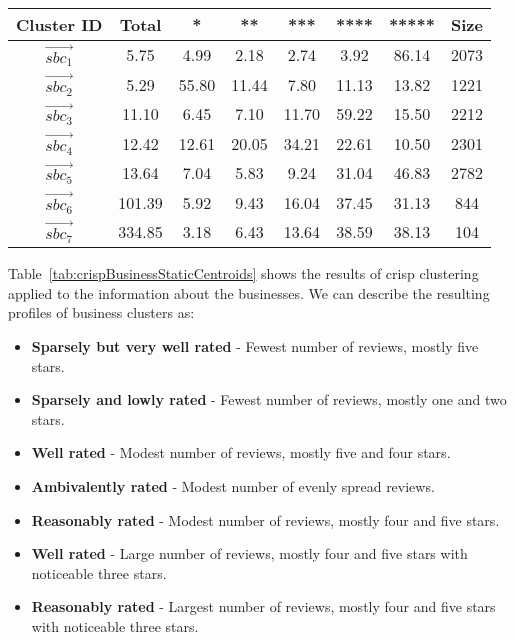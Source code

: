 \documentclass[oribibl]{llncs}
\begin{document}
\begin{table*}[h]
	\caption{Centroids from crisp  clustering of business data }
\centering
\small
{\setlength{\tabcolsep}{0.1cm}
\begin{tabular}{|c|c|c|c|c|c|c|c|}
\hline
 Cluster ID&Total  & *&**&***&****&*****&Size\\
  \hline
$\vec{sbc_1}$&5.75&4.99&2.18&2.74&3.92&86.14&2073\\
\hline
$\vec{sbc_2}$&5.29&55.80&11.44&7.80&11.13&13.82&1221\\
\hline
$\vec{sbc_3}$&11.10&6.45&7.10&11.70&59.22&15.50&2212\\
\hline
$\vec{sbc_4}$&12.42&12.61&20.05&34.21&22.61&10.50&2301\\
\hline
$\vec{sbc_5}$&13.64&7.04&5.83&9.24&31.04&46.83&2782\\
\hline
$\vec{sbc_6}$&101.39&5.92&9.43&16.04&37.45&31.13&844\\
\hline
$\vec{sbc_7}$&334.85&3.18&6.43&13.64&38.59&38.13&104\\
\hline
\end{tabular}}
\label{tab:crispBusinessStaticCentroids} 
\end{table*}

Table~\ref{tab:crispBusinessStaticCentroids} shows the results of crisp clustering applied to the information about the businesses.
We can describe the resulting profiles of business clusters as:
\begin{itemize}
\item [$\vec{sbc}_1$] {\bf Sparsely but very well rated} - Fewest number of reviews, mostly five stars.
\item [$\vec{sbc}_2$] {\bf Sparsely and lowly rated} - Fewest number of reviews, mostly one and two stars.
\item [$\vec{sbc}_3$] {\bf Well rated} - Modest number of reviews, mostly five and four stars.
\item [$\vec{sbc}_4$] {\bf Ambivalently rated} - Modest number of evenly spread reviews.
\item [$\vec{sbc}_5$] {\bf Reasonably rated} - Modest number of reviews, mostly four and five stars.
\item [$\vec{sbc}_6$] {\bf Well rated} - Large number of reviews, mostly  four and five stars with noticeable three stars.
\item [$\vec{sbc}_7$] {\bf Reasonably rated} - Largest number of reviews, mostly  four and five stars with noticeable three stars.
\end{itemize}
\end{document}
